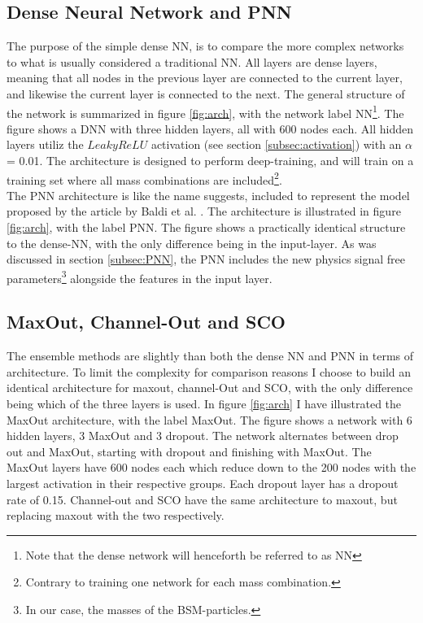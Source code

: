 \subsection*{Dense Neural Network and PNN}\label{subsec:PNNArch}
The purpose of the simple dense \ac{NN}, is to compare the more complex networks to what is usually considered a traditional \ac{NN}.
All layers are dense layers, meaning that all nodes in the previous layer are connected to the current layer, and likewise
the current layer is connected to the next. The general structure of the network is summarized in figure \ref{fig:arch}, with 
the network label \ac{NN}\footnote{Note that the dense network will henceforth be referred to as \ac{NN}}. The figure shows a \ac{DNN} with 
three hidden layers, all with 600 nodes each. All hidden layers utiliz the $LeakyReLU$ activation (see section \ref{subsec:activation})
with an $\alpha$ = 0.01. The architecture is designed to perform deep-training, and will train on a training set where all mass combinations 
are included\footnote{Contrary to training one network for each mass combination.}. 
\\
The \ac{PNN} architecture is like the name suggests, included to represent the model proposed by the article by Baldi et al. \cite{PNN}.
The architecture is illustrated in figure \ref{fig:arch}, with the label PNN. The figure shows a practically identical 
structure to the dense-\ac{NN}, with the only difference being in the input-layer. As was discussed in section \ref{subsec:PNN},
the \ac{PNN} includes the new physics signal free parameters\footnote{In our case, the masses of the \ac{BSM}-particles.} alongside the features
in the input layer.
\subsection*{MaxOut, Channel-Out and \ac{SCO}}
The ensemble methods are slightly than both the dense \ac{NN} and \ac{PNN} in terms of architecture. To limit the complexity for comparison reasons
I choose to build an identical architecture for maxout, channel-Out and \ac{SCO}, with the only difference being which of the three layers is used.  
In figure \ref{fig:arch} I have illustrated the MaxOut architecture, with the label MaxOut. The figure shows a network with 6 hidden layers, 
3 MaxOut and 3 dropout. The network alternates between drop out and MaxOut, starting with dropout and finishing with MaxOut. The MaxOut layers 
have 600 nodes each which reduce down to the 200 nodes with the largest activation in their respective groups. Each dropout layer has a dropout 
rate of 0.15. Channel-out and \ac{SCO} have the same architecture to maxout, but replacing maxout with the two respectively. 

